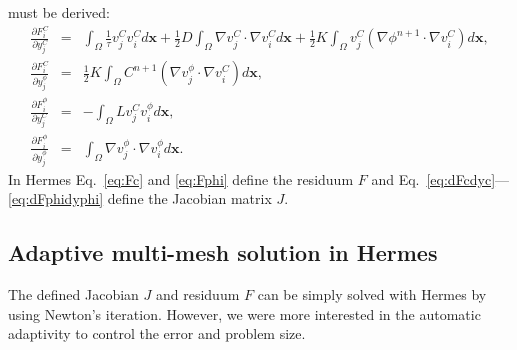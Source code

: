 must be derived: 
\begin{eqnarray}
  \frac{\partial F_i^C}{\partial y_j^C} &=& 
  \int_{\Omega} \frac{1}{\tau} v_j^C v_i^C d\mathbf{x} + 
  \frac 12 D\int_{\Omega} \nabla v_j^C \cdot \nabla v_i^C d\mathbf{x}
  + \frac 12 K\int_{\Omega} v_j^C \left(\nabla \phi^{n+1} \cdot \nabla v_i^C\right) d\mathbf{x},\label{eq:dFcdyc}\\
  \frac{\partial F_i^C}{\partial y_j^{\phi}} &=&
  \frac 12 K \int_{\Omega} C^{n+1} \left(\nabla v_j^{\phi} \cdot \nabla v_i^C\right) d\mathbf{x},\\
  \frac{\partial F_i^{\phi}}{\partial y_j^C} &=&
  - \int_{\Omega} L v_j^C v_i^{\phi} d\mathbf{x},\\
  \frac{\partial F_i^{\phi}}{\partial y_j^{\phi}} &=&
  \int_{\Omega} \nabla v_j^{\phi} \cdot \nabla v_i^{\phi} d\mathbf{x}\label{eq:dFphidyphi}.
\end{eqnarray}
In Hermes Eq.~\eqref{eq:Fc} and \eqref{eq:Fphi} define the residuum $F$ and
Eq.~\eqref{eq:dFcdyc}---\eqref{eq:dFphidyphi} define the Jacobian matrix $J$.

\subsection{Adaptive multi-mesh solution in Hermes}

The defined Jacobian $J$ and residuum $F$ can be simply solved with Hermes by
using Newton's iteration. However, we were more interested in the automatic
adaptivity to control the error and problem size.

